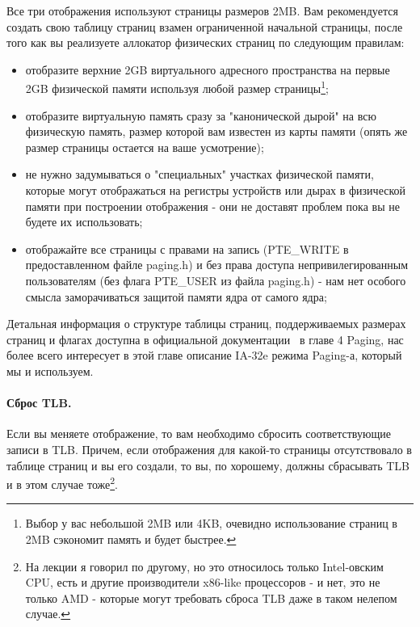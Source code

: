 Все три отображения используют страницы размеров 2MB. Вам рекомендуется создать
свою таблицу страниц взамен ограниченной начальной страницы, после того как вы
реализуете аллокатор физических страниц по следующим правилам:
\begin{itemize}
  \item отобразите верхние 2GB виртуального адресного пространства на первые 2GB
        физической памяти используя любой размер страницы\footnote{Выбор у вас
        небольшой 2MB или 4KB, очевидно использование страниц в 2MB сэкономит
        память и будет быстрее.};
  \item отобразите виртуальную память сразу за "канонической дырой" на всю
        физическую память, размер которой вам известен из карты памяти (опять
        же размер страницы остается на ваше усмотрение);
  \item не нужно задумываться о "специальных" участках физической памяти,
        которые могут отображаться на регистры устройств или дырах в физической
        памяти при построении отображения - они не доставят проблем пока вы не
        будете их использовать;
  \item отображайте все страницы с правами на запись (PTE\_WRITE в
        предоставленном файле paging.h) и без права доступа непривилегированным
        пользователям (без флага PTE\_USER из файла paging.h) - нам нет особого
        смысла заморачиваться защитой памяти ядра от самого ядра;
\end{itemize}

Детальная информация о структуре таблицы страниц, поддерживаемых размерах
страниц и флагах доступна в официальной документации~\cite{INTEL:SYSV3} в главе
4 Paging, нас более всего интересует в этой главе описание IA-32e режима
Paging-а, который мы и используем.

\paragraph{Сброс TLB.} Если вы меняете отображение, то вам необходимо сбросить
соответствующие записи в TLB. Причем, если отображения для какой-то страницы
отсутствовало в таблице страниц и вы его создали, то вы, по хорошему, должны
сбрасывать TLB и в этом случае тоже\footnote{На лекции я говорил по другому, но
это относилось только Intel-овским CPU, есть и другие производители x86-like
процессоров - и нет, это не только AMD - которые могут требовать сброса TLB
даже в таком нелепом случае.}.

